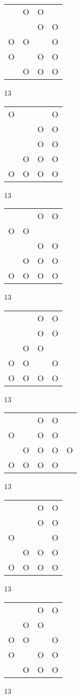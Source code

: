 \begin{tabular}{|m{0.2cm}m{0.2cm}m{0.2cm}m{0.2cm}|}\hline
 &O&O& \\
 & &O&O\\
O&O& &O\\
O& &O&O\\
 &O&O&O\\
\hline\end{tabular}13
\begin{tabular}{|m{0.2cm}m{0.2cm}m{0.2cm}m{0.2cm}|}\hline
O& & &O\\
 & &O&O\\
 & &O&O\\
 &O&O&O\\
O&O&O&O\\
\hline\end{tabular}13
\begin{tabular}{|m{0.2cm}m{0.2cm}m{0.2cm}m{0.2cm}|}\hline
 & &O&O\\
O&O& & \\
 & &O&O\\
 &O&O&O\\
O&O&O&O\\
\hline\end{tabular}13
\begin{tabular}{|m{0.2cm}m{0.2cm}m{0.2cm}m{0.2cm}|}\hline
 & &O&O\\
 & &O&O\\
 &O&O& \\
O&O& &O\\
O&O&O&O\\
\hline\end{tabular}13
\begin{tabular}{|m{0.2cm}m{0.2cm}m{0.2cm}m{0.2cm}m{0.2cm}|}\hline
 & &O&O& \\
O& &O&O& \\
 &O&O&O&O\\
O&O&O&O& \\
\hline\end{tabular}13
\begin{tabular}{|m{0.2cm}m{0.2cm}m{0.2cm}m{0.2cm}|}\hline
 & &O&O\\
 & &O&O\\
O& & &O\\
 &O&O&O\\
O&O&O&O\\
\hline\end{tabular}13
\begin{tabular}{|m{0.2cm}m{0.2cm}m{0.2cm}m{0.2cm}|}\hline
 & &O&O\\
 &O&O& \\
O&O& &O\\
O& &O&O\\
 &O&O&O\\
\hline\end{tabular}13
